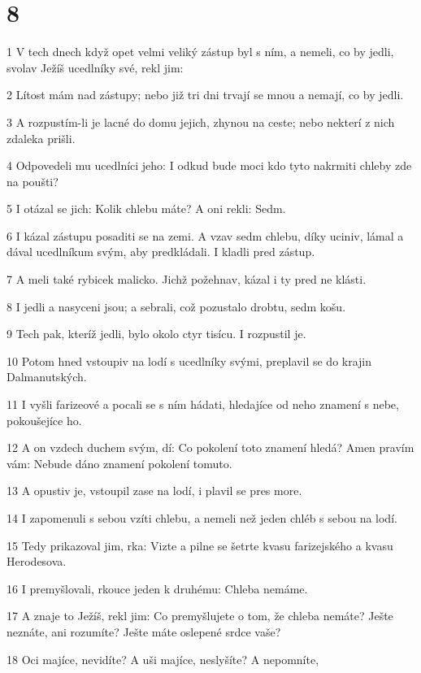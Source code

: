 \chapter{8}

\par 1 V tech dnech když opet velmi veliký zástup byl s ním, a nemeli, co by jedli, svolav Ježíš ucedlníky své, rekl jim:
\par 2 Lítost mám nad zástupy; nebo již tri dni trvají se mnou a nemají, co by jedli.
\par 3 A rozpustím-li je lacné do domu jejich, zhynou na ceste; nebo nekterí z nich zdaleka prišli.
\par 4 Odpovedeli mu ucedlníci jeho: I odkud bude moci kdo tyto nakrmiti chleby zde na poušti?
\par 5 I otázal se jich: Kolik chlebu máte? A oni rekli: Sedm.
\par 6 I kázal zástupu posaditi se na zemi. A vzav sedm chlebu, díky uciniv, lámal a dával ucedlníkum svým, aby predkládali. I kladli pred zástup.
\par 7 A meli také rybicek malicko. Jichž požehnav, kázal i ty pred ne klásti.
\par 8 I jedli a nasyceni jsou; a sebrali, což pozustalo drobtu, sedm košu.
\par 9 Tech pak, kteríž jedli, bylo okolo ctyr tisícu. I rozpustil je.
\par 10 Potom hned vstoupiv na lodí s ucedlníky svými, preplavil se do krajin Dalmanutských.
\par 11 I vyšli farizeové a pocali se s ním hádati, hledajíce od neho znamení s nebe, pokoušejíce ho.
\par 12 A on vzdech duchem svým, dí: Co pokolení toto znamení hledá? Amen pravím vám: Nebude dáno znamení pokolení tomuto.
\par 13 A opustiv je, vstoupil zase na lodí, i plavil se pres more.
\par 14 I zapomenuli s sebou vzíti chlebu, a nemeli než jeden chléb s sebou na lodí.
\par 15 Tedy prikazoval jim, rka: Vizte a pilne se šetrte kvasu farizejského a kvasu Herodesova.
\par 16 I premyšlovali, rkouce jeden k druhému: Chleba nemáme.
\par 17 A znaje to Ježíš, rekl jim: Co premyšlujete o tom, že chleba nemáte? Ješte neznáte, ani rozumíte? Ješte máte oslepené srdce vaše?
\par 18 Oci majíce, nevidíte? A uši majíce, neslyšíte? A nepomníte,
